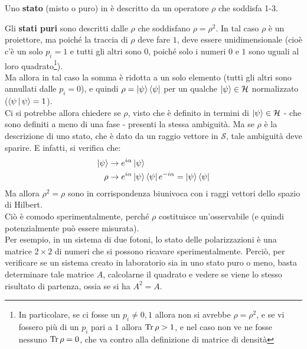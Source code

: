 \documentclass[../../FisicaTeorica.tex]{subfiles}
\begin{document}
\begin{dfn}
Uno \textbf{stato} (misto o puro) in \MQ è descritto da un operatore $\rho$ che soddisfa 1-3.
\end{dfn}
Gli \textbf{stati puri} sono descritti dalle $\rho$ che soddisfano $\rho =\rho^2$. In tal caso $\rho$  è un proiettore, ma poiché la traccia di $\rho$ deve fare $1$, deve essere unidimensionale (cioè c'è un solo $p_i=1$ e tutti gli altri sono $0$, poiché solo i numeri $0$ e $1$ sono uguali al loro quadrato\footnote{In particolare, se ci fosse un $p_i \neq 0,1$ allora non si avrebbe $\rho = \rho^2$, e se vi fossero più di un $p_i$ pari a $1$ allora $\operatorname{Tr}\rho > 1$, e nel caso non ve ne fosse nessuno $\operatorname{Tr}\rho = 0$, che va contro alla definizione di matrice di densità}).\\
Ma allora in tal caso la somma è ridotta a un solo elemento (tutti gli altri sono annullati dalle $p_i = 0$), e quindi $\rho =\Ket{\psi}\Bra{\psi}$ per un qualche $\Ket{\psi}\in \mathcal{H}$ normalizzato  ($\Braket{\psi|\psi}=1$).\\
Ci si potrebbe allora chiedere se $\rho$, visto che è definito in termini di $\Ket{\psi}\in \mathcal{H}$ - che sono definiti a meno di una fase - presenti la stessa ambiguità. Ma se $\rho$ è la descrizione di uno stato, che è dato da un raggio vettore in $\mathcal{S}$, tale ambiguità deve sparire. E infatti, si verifica che:
\begin{align*}
    \Ket{\psi}&\rightarrow e^{i\alpha}\Ket{\psi}\\
\rho &\rightarrow e^{i\alpha}\Ket{\psi}\Bra{\psi}e^{-i\alpha}=\Ket{\psi}\Bra{\psi}
\end{align*}
Ma allora $\rho^2=\rho$ sono in corrispondenza biunivoca con i raggi vettori dello spazio di Hilbert.\\
Ciò è comodo sperimentalmente, perché $\rho$ costituisce un'osservabile (e quindi potenzialmente può essere misurata).\\
Per esempio, in un sistema di due fotoni, lo stato delle polarizzazioni è una matrice $2\times 2$ di numeri che si possono ricavare sperimentalmente. Perciò, per verificare se un sistema creato in laboratorio sia in uno stato puro o meno, basta determinare tale matrice $A$, calcolarne il quadrato e vedere se viene lo stesso risultato di partenza, ossia se si ha $A^2 = A$.\\
\end{document}
